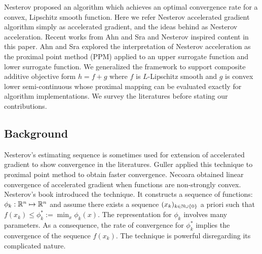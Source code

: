 \documentclass[12pt]{article}
\begin{document}
    Nesterov \cite{nesterov_method_1983} proposed an algorithm which achieves an optimal convergence rate for a convex, Lipschitz smooth function. 
    Here we refer Nesterov accelerated gradient algorithm simply as accelerated gradient, and the ideas behind as Nesterov acceleration. 
    Recent works from Ahn and Sra \cite{ahn_understanding_2022} and Nesterov \cite{nesterov_lectures_2018} inspired content in this paper.
    Ahn and Sra explored the interpretation of Nesterov acceleration as the proximal point method (PPM) applied to an upper surrogate function and lower surrogate function. 
    We generalized the framework to support composite additive objective form $h = f + g$ where $f$ is $L$-Lipschitz smooth and $g$ is convex lower semi-continuous whose proximal mapping can be evaluated exactly for algorithm implementations. 
    We survey the literatures before stating our contributions. 
    

    \subsection{Background}
        Nesterov's estimating sequence is sometimes used for extension of accelerated gradient to show convergence in the literatures. 
        Guller \cite{guler_new_1992} applied this technique to proximal point method to obtain faster convergence. 
        Necoara \cite{necoara_linear_2019} obtained linear convergence of accelerated gradient when functions are non-strongly convex. 
        Nesterov's book \cite[chapter 2]{nesterov_lectures_2018} introduced the technique. 
        It constructs a sequence of functions: $\phi_k:\mathbb R^n \mapsto \mathbb R^n$ and assume there exists a sequence $(x_k)_{k\in \mathbb N \cup \{0\}}$ a priori such that $f(x_k) \le \phi_k^* := \min_x \phi_k(x)$. 
        The representation for $\phi_k$ involves many parameters. 
        As a consequence, the rate of convergence for $\phi_k^*$ implies the convergence of the sequence $f(x_k)$. 
        The technique is powerful disregarding its complicated nature. 
        
\end{document}
